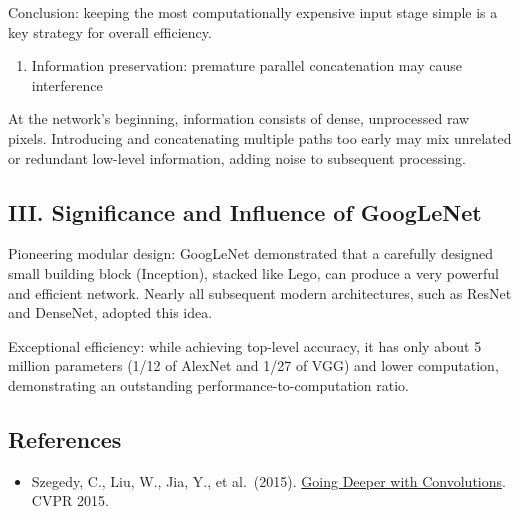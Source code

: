 Conclusion: keeping the most computationally expensive input stage simple is a key strategy for overall efficiency.

\begin{enumerate}
\def\labelenumi{(\arabic{enumi})}
\setcounter{enumi}{2}
\tightlist
\item
  Information preservation: premature parallel concatenation may cause interference
\end{enumerate}

At the network's beginning, information consists of dense, unprocessed raw pixels. Introducing and concatenating multiple paths too early may mix unrelated or redundant low-level information, adding noise to subsequent processing.

\hypertarget{iii.-significance-and-influence-of-googlenet}{%
\subsection{III. Significance and Influence of GoogLeNet}\label{iii.-significance-and-influence-of-googlenet}}

Pioneering modular design: GoogLeNet demonstrated that a carefully designed small building block (Inception), stacked like Lego, can produce a very powerful and efficient network. Nearly all subsequent modern architectures, such as ResNet and DenseNet, adopted this idea.

Exceptional efficiency: while achieving top-level accuracy, it has only about 5 million parameters (1/12 of AlexNet and 1/27 of VGG) and lower computation, demonstrating an outstanding performance-to-computation ratio.

\FloatBarrier
{}
\hypertarget{references-13}{%
\subsection{References}\label{references-13}}

\vspace{0.25em}
\begin{itemize}
\tightlist
\item
  Szegedy, C., Liu, W., Jia, Y., et al.~(2015). \href{https://arxiv.org/abs/1409.4842}{Going Deeper with Convolutions}. CVPR 2015.
\end{itemize}

\clearpage
